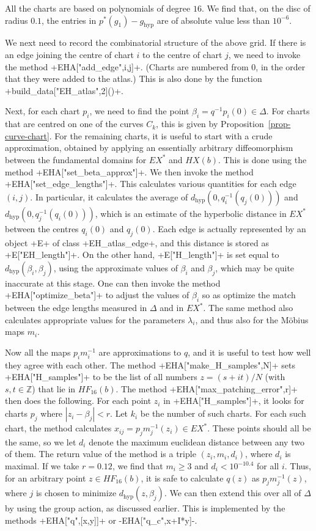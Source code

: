 \documentclass[reqno]{amsart}
\newcommand{\hyp}	{\operatorname{hyp}}
\newcommand{\Dl}        {\Delta}
\newcommand{\bt}        {\beta}
\newcommand{\lm}        {\lambda}
\newcommand{\Z}         {{\mathbb{Z}}}
\renewcommand{\:}{\colon}
\theoremstyle{definition}
\begin{document}
All the charts are based on polynomials of degree $16$.  We find that,
on the disc of radius $0.1$, the entries in $p^*(g_1)-g_{\hyp}$ are of
absolute value less than $10^{-6}$.

We next need to record the combinatorial structure of the above grid.
If there is an edge joining the centre of chart $i$ to the centre of
chart $j$, we need to invoke the method \mcode+EHA["add_edge",i,j]+.
(Charts are numbered from $0$, in the order that they were added to
the atlas.)  This is also done by the function
\mcode+build_data["EH_atlas",2]()+.

Next, for each chart $p_i$, we need to find the point
$\bt_i=q^{-1}p_i(0)\in\Dl$.  For charts that are centred on one of the
curves $C_k$, this is given by Proposition~\ref{prop-curve-chart}.
For the remaining charts, it is useful to start with a crude
approximation, obtained by applying an essentially arbitrary
diffeomorphism between the fundamental domains for $EX^*$ and
$HX(b)$.  This is done using the method
\mcode+EHA["set_beta_approx"]+.  We then invoke the method
\mcode+EHA["set_edge_lengths"]+.  This calculates various quantities
for each edge $(i,j)$.  In particular, it calculates the average of
$d_{\hyp}(0,q_i^{-1}(q_j(0)))$ and $d_{\hyp}(0,q_j^{-1}(q_i(0)))$,
which is an estimate of the hyperbolic distance in $EX^*$ between the
centres $q_i(0)$ and $q_j(0)$.  Each edge is actually represented by
an object \mcode+E+ of class \mcode+EH_atlas_edge+, and this distance
is stored as \mcode+E["EH_length"]+.  On the other hand,
\mcode+E["H_length"]+ is set equal to $d_{\hyp}(\bt_i,\bt_j)$, using the
approximate values of $\bt_i$ and $\bt_j$, which may be quite
inaccurate at this stage.  One can then invoke the method
\mcode+EHA["optimize_beta"]+ to adjust the values of $\bt_i$ so as
optimize the match between the edge lengths measured in $\Dl$ and in
$EX^*$.  The same method also calculates appropriate values for the
parameters $\lm_i$, and thus also for the M\"obius maps $m_i$.

Now all the maps $p_im_i^{-1}$ are approximations to $q$, and it is
useful to test how well they agree with each other.  The method
\mcode+EHA["make_H_samples",N]+ sets \mcode+EHA["H_samples"]+ to be
the list of all numbers $z=(s+it)/N$ (with $s,t\in\Z$) that lie in
$HF_{16}(b)$.  The method \mcode+EHA["max_patching_error",r]+ then
does the following.  For each point $z_i$ in \mcode+EHA["H_samples"]+,
it looks for charts $p_j$ where $|z_i-\bt_j|<r$.  Let $k_i$ be the
number of such charts.  For each such chart, the method
calculates $x_{ij}=p_jm_j^{-1}(z_i)\in EX^*$.  These points should
all be the same, so we let $d_i$ denote the maximum euclidean
distance between any two of them.  The return value of the method is
a triple $(z_i,m_i,d_i)$, where $d_i$ is maximal.  If we take
$r=0.12$, we find that $m_i\geq 3$ and $d_i<10^{-10.4}$ for all $i$.
Thus, for an arbitrary point $z\in HF_{16}(b)$, it is safe to
calculate $q(z)$ as $p_jm_j^{-1}(z)$, where $j$ is chosen to minimize
$d_{\hyp}(z,\bt_j)$.  We can then extend this over all of $\Dl$ by
using the group action, as discussed earlier.  This is implemented by
the methods \mcode+EHA["q",[x,y]]+ or \mcode-EHA["q_c",x+I*y]-.
\end{document}
